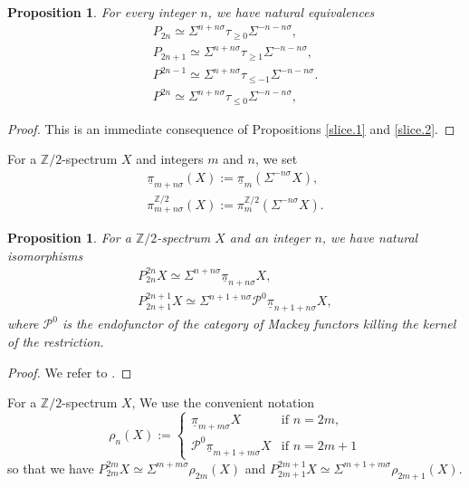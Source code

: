 \documentclass[10pt]{amsart}
\newtheorem{prop}[thm]{Proposition}
\theoremstyle{definition}
\numberwithin{equation}{section}
\newcommand{\Z}{\mathbb{Z}}
\newcommand{\cP}{\mathcal{P}}
\newcommand{\ul}{\underline}
\begin{document}
{\begin{prop}
\label{slice.3}
For every integer $n$,
we have natural equivalences
\begin{gather*}
P_{2n}\simeq \Sigma^{n+n\sigma}\tau_{\geq 0}\Sigma^{-n-n\sigma},
\\
P_{2n+1}\simeq
\Sigma^{n+n\sigma}\tau_{\geq 1}\Sigma^{-n-n\sigma},
\\
P^{2n-1}
\simeq
\Sigma^{n+n\sigma}\tau_{\leq -1}\Sigma^{-n-n\sigma}.
\\
P^{2n}
\simeq
\Sigma^{n+n\sigma}\tau_{\leq 0}\Sigma^{-n-n\sigma},
\end{gather*}
\end{prop}
\begin{proof}
This is an immediate consequence of Propositions \ref{slice.1} and \ref{slice.2}.
\end{proof}


For a $\Z/2$-spectrum $X$ and integers $m$ and $n$,
we set
\begin{gather*}
\ul{\pi}_{m+n\sigma}(X)
:=
\ul{\pi}_{m}(\Sigma^{-n\sigma} X),
\\
\pi_{m+n\sigma}^{\Z/2}(X)
:=
\pi_{m}^{ \Z/2}(\Sigma^{-n\sigma} X).
\end{gather*}

\begin{prop}
\label{slice.4}
For a $\Z/2$-spectrum $X$ and an integer $n$,
we have natural isomorphisms
\begin{gather*}
P_{2n}^{2n} X
\simeq
\Sigma^{n+n\sigma} \ul{\pi}_{n+n\sigma} X,
\\
P_{2n+1}^{2n+1} X
\simeq
\Sigma^{n+1+n\sigma} \cP^0 \ul{\pi}_{n+1+n\sigma} X,
\end{gather*}
where $\cP^0$ is the endofunctor of the category of Mackey functors killing the kernel of the restriction.
\end{prop}
\begin{proof}
We refer to \cite[Theorem 17.5.25]{Hil20}.
\end{proof}


For a $\Z/2$-spectrum $X$,
We use the convenient notation
\begin{equation}
\label{slice.4.1}
\rho_n(X)
:=
\left\{
\begin{array}{ll}
\ul{\pi}_{m+m\sigma} X &\text{if $n=2m$,}
\\
\cP^0\ul{\pi}_{m+1+m\sigma} X & \text{if $n=2m+1$}
\end{array}
\right.
\end{equation}
so that we have $P_{2m}^{2m}  X \simeq \Sigma^{m+m\sigma} \rho_{2m}(X)$ and $P_{2m+1}^{2m+1}X\simeq \Sigma^{m+1+m\sigma}\rho_{2m+1}(X)$.




}
\end{document}

